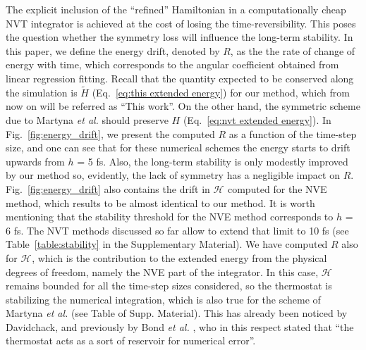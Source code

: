 \documentclass[
journal=jctcce,
layout=twocolumn
]{achemso}
\newcommand{\Ham}[1]{{\mathcal H}_\text{#1}}    %
\begin{document}
The explicit inclusion of the ``refined'' Hamiltonian in a computationally cheap NVT integrator is achieved at the cost of losing the time-reversibility.
This poses the question whether the symmetry loss will influence the long-term stability.
In this paper, we define the energy drift, denoted by $R$, as the the rate of change of energy with time, which corresponds to the angular coefficient obtained from linear regression fitting.
Recall that the quantity expected to be conserved along the simulation is $\widetilde{H}$ (Eq.~\ref{eq:this extended energy}) for our method, which from now on will be referred as ``This work''.
On the other hand, the symmetric scheme due to Martyna \textit{et al.} \cite{Martyna_1996} should preserve $H$ (Eq.~\ref{eq:nvt extended energy}).
In Fig.~\ref{fig:energy_drift}, we present the computed $R$ as a function of the time-step size, and one can see that for these numerical schemes the energy starts to drift upwards from $h$ = 5 fs. 
Also, the long-term stability is only modestly improved by our method so, evidently, the lack of symmetry has a negligible impact on $R$.
Fig.~\ref{fig:energy_drift} also contains the drift in $\Ham{}$ computed for the NVE method\cite{Silveira_2017}, which results to be almost identical to our method.
It is worth mentioning that the stability threshold for the NVE method corresponds to $h$ = 6 fs.
The NVT methods discussed so far allow to extend that limit to 10 fs (see Table~\ref{table:stability} in the Supplementary Material).
We have computed $R$ also for $\Ham{}$, which is the contribution to the extended energy from the physical degrees of freedom, namely the NVE part of the integrator.
In this case, $\Ham{}$ remains bounded for all the time-step sizes considered, so the thermostat is stabilizing the numerical integration, which is also true for the scheme of Martyna \textit{et al.} \cite{Martyna_1996} (see Table of Supp. Material).
This has already been noticed by Davidchack\cite{Davidchack_2009}, and previously by Bond \textit{et al.} \cite{Bond_2007}, who in this respect stated that ``the thermostat acts as a sort of reservoir for numerical error''.
\end{document}
